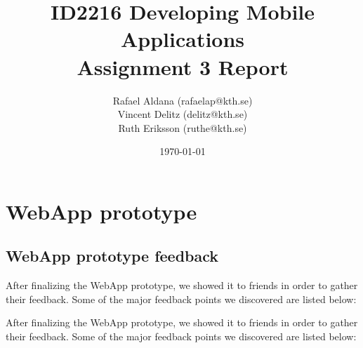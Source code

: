 \documentclass[11pt,twoside,a4paper]{report}
\begin{document}
\title{ID2216 Developing Mobile Applications\\Assignment 3 Report}
\author{Rafael Aldana (rafaelap@kth.se)\\Vincent Delitz (delitz@kth.se)\\Ruth Eriksson (ruthe@kth.se)}
\date{\today}
\maketitle



\tableofcontents
\thispagestyle{empty}



\renewcommand{\chaptername}{Assignment}
\setcounter{chapter}{1}
\chapter{WebApp prototype}
\setcounter{page}{1}

\section{WebApp prototype feedback}

After finalizing the WebApp prototype, we showed it to friends in order to gather their feedback. Some of the major feedback points we discovered are listed below:

After finalizing the WebApp prototype, we showed it to friends in order to gather their feedback. Some of the major feedback points we discovered are listed below:
\end{document}
